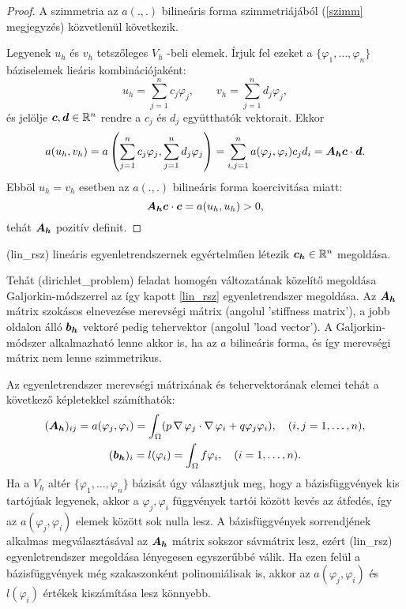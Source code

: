 \begin{proof}
	 A szimmetria  az  $a(.,.)$ bilineáris forma szimmetriájából (\ref{szimm} megjegyzés) közvetlenül következik.
	 
	 Legyenek  $u_h$ és $v_h$ tetszőleges $V_h$ -beli elemek. Írjuk fel ezeket a  $\{\varphi_1, \ldots, \varphi_n \}$ báziselemek lieáris kombinációjaként:
	\begin{equation*}
			u_h = \sum_{j=1}^n c_j\varphi_j, \qquad  v_h = \sum_{j=1}^n d_j\varphi_j,
	\end{equation*}
	és jelölje $\bm{c}, \bm{d} \in \mathbb{R}^n$ rendre a $c_j$ és $d_j$ együtthatók vektorait. Ekkor
	\begin{equation*}
			a(u_h,v_h) = a\left( \sum_{j=1}^n c_j\varphi_j, \sum_{j=1}^n d_j\varphi_j \right) = \sum_{i,j=1}^n a(\varphi_j,\varphi_i)c_j d_i = \bm{A_h}\bm{c} \cdot \bm{d}.
	\end{equation*}
	Ebböl $u_h = v_h$ esetben az $a(.,.)$ bilineáris forma koercivitása miatt:
	\begin{equation*}
			\bm{A_h}\bm{c} \cdot \bm{c} =  a(u_h,u_h) > 0,
	\end{equation*}
	tehát $\bm{A_h}$ pozitív definit.
\end{proof}

\begin{corollary}
	\Aref({lin_rsz}) lineáris egyenletrendszernek egyértelműen létezik $\bm{c_h} \in \mathbb{R}^n$ megoldása.
\end{corollary}

 Tehát \aref({dirichlet_problem})  feladat homogén változatának közelítő megoldása  Galjorkin-módszerrel az így kapott \eqref{lin_rsz} egyenletrendszer megoldása. Az $\bm{A_h}$ mátrix szokásos elnevezése merevségi mátrix (angolul 'stiffness matrix'), a jobb oldalon álló  $\bm{b_h}$ vektoré pedig tehervektor (angolul 'load vector'). A Galjorkin-módszer alkalmazható lenne akkor is, ha az $a$ bilineáris forma, és így merevségi mátrix nem lenne szimmetrikus.
 
 Az egyenletrendszer merevségi mátrixának és tehervektorának elemei tehát a következő képletekkel számíthatók:
\begin{gather*}
	(\bm{A_h})_{ij}  = a(\varphi_j,\varphi_i) = \int_{\Omega} (p \operatorname{\nabla} \varphi_j  \cdot  \operatorname{\nabla} \varphi_i + q \varphi_j \varphi_i), \quad  (i,j = 1, \ldots ,n),\\
	(\bm{b_h})_i =  l(\varphi_i) = \int_{\Omega} f \varphi_i, \quad (i = 1, \ldots ,n).
\end{gather*}
Ha  a $V_h$ altér $\{\varphi_1, \ldots, \varphi_n \}$ bázisát úgy választjuk meg, hogy a bázisfüggvények kis tartójúak legyenek, akkor a $\varphi_j,\varphi_i$ függvények tartói között kevés az átfedés, így az $a(\varphi_j,\varphi_i)$ elemek között sok nulla lesz.  A bázisfüggvények sorrendjének alkalmas megválasztásával az $\bm{A_h}$ mátrix sokszor sávmátrix lesz, ezért \aref({lin_rsz}) egyenletrendszer megoldása lényegesen egyszerűbbé válik. Ha ezen felül a bázisfüggvények még szakaszonként polinomiálisak is, akkor az $a(\varphi_j,\varphi_i)$ és $l(\varphi_i)$ értékek kiszámítása lesz könnyebb.

